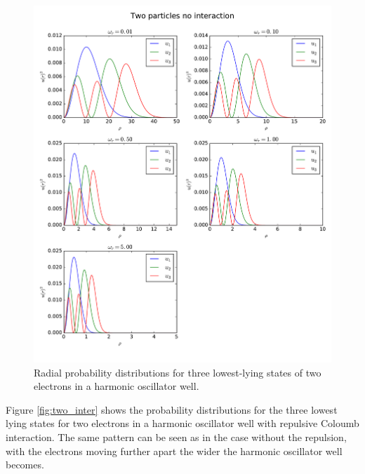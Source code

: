 \documentclass{article}
\begin{document}
\begin{figure}[h]
    \includegraphics[width=\linewidth]{fig/Two_particles_no_interaction.pdf}
    \caption{Radial probability distributions for three lowest-lying states of two electrons in a harmonic oscillator well.}
    \label{fig:two}
\end{figure}

Figure \ref{fig:two_inter} shows the probability distributions for the three lowest lying states for two electrons in a harmonic oscillator well with repulsive Coloumb interaction. The same pattern can be seen as in the case without the repulsion, with the electrons moving further apart the wider the harmonic oscillator well becomes. 
\end{document}
